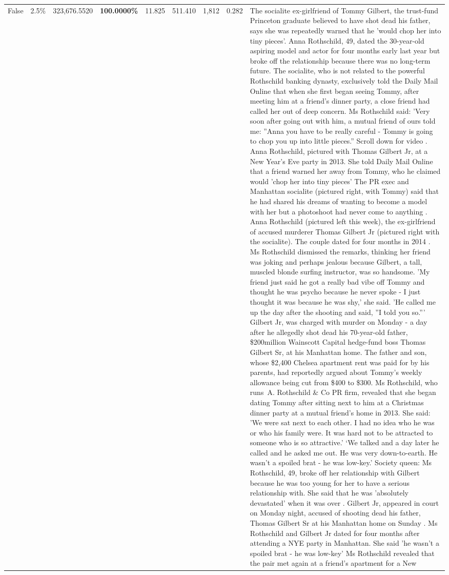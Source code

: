 \begin{table}[H]
\begin{tabular}{lllrlllll}
False & 2.5\% & 323,676.5520 & \bfseries \color{red} 100.0000\% & 11.825 & 511.410 & 1,812 & 0.282 & The socialite ex-girlfriend of Tommy Gilbert, the trust-fund Princeton graduate believed to have shot dead his father, says she was repeatedly warned that he 'would chop her into tiny pieces'. Anna Rothschild, 49, dated the 30-year-old aspiring model and actor for four months early last year but broke off the relationship because there was no long-term future. The socialite, who is not related to the powerful Rothschild banking dynasty, exclusively told the Daily Mail Online that when she first began seeing Tommy, after meeting him at a friend's dinner party, a close friend had called her out of deep concern. Ms Rothschild said: 'Very soon after going out with him, a mutual friend of ours told me: ''Anna you have to be really careful - Tommy is going to chop you up into little pieces.'' Scroll down for video . Anna Rothschild, pictured with Thomas Gilbert Jr, at a New Year's Eve party in 2013. She told Daily Mail Online that a friend warned her away from Tommy, who he claimed would 'chop her into tiny pieces' The PR exec and Manhattan socialite (pictured right, with Tommy) said that he had shared his dreams of wanting to become a model with her but a photoshoot had never come to anything . Anna Rothschild (pictured left this week), the ex-girlfriend of accused murderer Thomas Gilbert Jr (pictured right with the socialite). The couple dated for four months in 2014 . Ms Rothschild dismissed the remarks, thinking her friend was joking and perhaps jealous because Gilbert, a tall, muscled blonde surfing instructor, was so handsome. 'My friend just said he got a really bad vibe off Tommy and thought he was psycho because he never spoke - I just thought it was because he was shy,' she said. 'He called me up the day after the shooting and said, ''I told you so.''' Gilbert Jr, was charged with murder on Monday - a day after he allegedly shot dead his 70-year-old father, \$200million Wainscott Capital hedge-fund boss Thomas Gilbert Sr, at his Manhattan home. The father and son, whose \$2,400 Chelsea apartment rent was paid for by his parents, had reportedly argued about Tommy's weekly allowance being cut from \$400 to \$300. Ms Rothschild, who runs A. Rothschild \& Co PR firm, revealed that she began dating Tommy after sitting next to him at a Christmas dinner party at a mutual friend's home in 2013. She said: 'We were sat next to each other. I had no idea who he was or who his family were. It was hard not to be attracted to someone who is so attractive.' ‘We talked and a day later he called and he asked me out. He was very down-to-earth. He wasn’t a spoiled brat - he was low-key.’ Society queen: Ms Rothschild, 49, broke off her relationship with Gilbert because he was too young for her to have a serious relationship with. She said that he was 'absolutely devastated' when it was over . Gilbert Jr, appeared in court on Monday night, accused of shooting dead his father, Thomas Gilbert Sr at his Manhattan home on Sunday . Ms Rothschild and Gilbert Jr dated for four months after attending a NYE party in Manhattan. She said 'he wasn't a spoiled brat - he was low-key' Ms Rothschild revealed that the pair met again at a friend’s apartment for a New 
\end{tabular}
\end{table}

